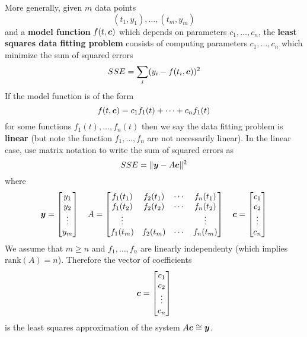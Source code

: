\begin{definition}
More generally, given $m$ data points
$$
(t_1,y_1) , \dots , (t_m,y_m)
$$
and a {\bf model function} $f(t,\boldsymbol{c})$ which depends on parameters $c_1,\dots,c_n$, the {\bf least squares data fitting problem} consists of computing parameters $c_1,\dots,c_n$ which minimize the sum of squared errors
$$
SSE = \sum_i (y_i - f(t_i,\boldsymbol{c}))^2
$$
If the model function is of the form
$$
f(t,\boldsymbol{c}) = c_1 f_1(t) + \cdots + c_n f_1(t)
$$
for some functions $f_1(t),\dots,f_n(t)$ then we say the data fitting problem is {\bf linear} \cite[p.106]{MH} (but note the function $f_1,\dots,f_n$ are not necessarily linear). In the linear case, use matrix notation to write the sum of squared errors as
$$
SSE = \Vert \boldsymbol{y} - A \boldsymbol{c} \Vert^2
$$
where
$$
\boldsymbol{y} = \begin{bmatrix} y_1 \\ y_2 \\ \vdots \\ y_m \end{bmatrix}
\ \ \
A = \begin{bmatrix}
f_1(t_1) & f_2(t_1) & \cdots & f_n(t_1) \\
f_1(t_2) & f_2(t_2) & \cdots & f_n(t_2) \\
\vdots & & & \vdots \\
f_1(t_m) & f_2(t_m) & \cdots & f_n(t_m)
\end{bmatrix}
\ \ \
\boldsymbol{c} = \begin{bmatrix} c_1 \\ c_2 \\ \vdots \\ c_n \end{bmatrix}
$$
We assume that $m \geq n$ and $f_1,\dots,f_n$ are linearly independenty (which implies $\mathrm{rank}(A) = n$). Therefore the vector of coefficients
$$
\boldsymbol{c} = \begin{bmatrix} c_1 \\ c_2 \\ \vdots \\ c_n \end{bmatrix}
$$
is the least squares approximation of the system $A \boldsymbol{c} \cong \boldsymbol{y}$.
\end{definition}